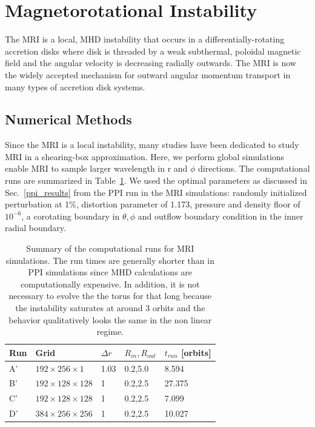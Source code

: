 \documentclass[iop,revtex4]{emulateapj}
\begin{document}
\section{Magnetorotational Instability}
\par The \acf{MRI} is a local, \ac{MHD} instability that occurs in a differentially-rotating accretion disks where disk is threaded by a weak subthermal, poloidal magnetic field and the angular velocity is decreasing radially outwards. The \ac{MRI} is now the widely accepted mechanism for outward angular momentum transport in many types of accretion disk systems. 
\subsection{Numerical Methods}
\par Since the \ac{MRI} is a local instability, many studies have been dedicated to study \ac{MRI} in a shearing-box approximation. Here, we perform global simulations enable MRI to sample larger wavelength in r and $\phi$ directions. The computational runs are summarized in Table~\ref{mri_table}. We used the optimal parameters as discussed in Sec.~\ref{ppi_results} from the \ac{PPI} run in the \ac{MRI} simulations: randomly initialized perturbation at 1\%, distortion parameter of 1.173, pressure and density floor of $10^{-6}$, a corotating boundary in $\theta,\phi$ and outflow boundary condition in the inner radial boundary.
\begin{table}
    \begin{tabular}{lllll}
    \hline
    Run                          & Grid                    & $\Delta r$ & $R_{in},R_{out}$ & $t_{run}$ [orbits] \\ \hline
    A'                      & $192\times256\times1$   & 1.03       & 0.2,5.0          & 8.594              \\
    B'               & $192\times128\times128$ & 1          & 0.2,2.5          & 27.375             \\
    C' & $192\times128\times128$ & 1          & 0.2,2.5          & 7.099              \\
    D'             & $384\times256\times256$ & 1          & 0.2,2.5          & 10.027 \\ \hline
    \end{tabular}
    \caption{Summary of the computational runs for \ac{MRI} simulations. The run times are generally shorter than in \ac{PPI} simulations since MHD calculations are computationally expensive. In addition, it is not necessary to evolve the the torus for that long because the instability saturates at around 3 orbits and the behavior qualitatively looks the same in the non linear regime.}
    \label{mri_table}
\end{table}
\end{document}
